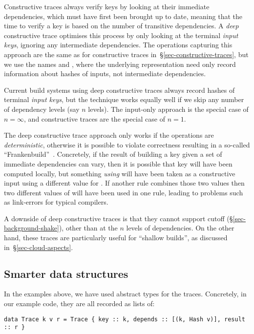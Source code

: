 Constructive traces always verify keys by looking at their immediate
dependencies, which must have first been brought up to date, meaning that the
time to verify a key is based on the number of transitive dependencies. A
\emph{deep} constructive trace optimises this process by only looking at the
terminal \emph{input keys}, ignoring any intermediate dependencies. The operations
capturing this approach are the same as for constructive traces
in~\S\ref{sec-constructive-traces}, but we use the names  and
, where the underlying  representation need only record
information about hashes of inputs, not intermediate dependencies.

Current build systems using deep constructive traces always record hashes of
terminal \emph{input keys}, but the technique works equally well if we skip any
number of dependency levels (say $n$ levels). The input-only approach is the
special case of $n = \infty$, and constructive traces are the special case of
$n = 1$.

The deep constructive trace approach only works if the operations are
\emph{deterministic}, otherwise it is possible to violate correctness resulting
in a so-called ``Frankenbuild''~\cite{esfahani2016cloudbuild}. Concretely, if
the result of building a key given a set of immediate dependencies can vary,
then it is possible that key  will have been computed locally, but
something \emph{using}  will have been taken as a constructive input using
a different value for . If another rule combines those two values then two
different values of  will have been used in one rule, leading to problems
such as link-errors for typical compilers.

A downside of deep constructive traces is that they cannot support cutoff
(\S\ref{sec-background-shake}), other than at the $n$ levels of dependencies. On
the other hand, these traces are particularly useful for ``shallow builds'', as
discussed in~\S\ref{sec-cloud-aspects}.

\subsection{Smarter \hs{[Trace]} data structures}\label{sec-smart-traces}

In the examples above, we have used abstract types for the traces. Concretely, in our example code, they are all recorded as lists of:

\begin{verbatim}
data Trace k v r = Trace { key :: k, depends :: [(k, Hash v)], result :: r }
\end{verbatim}

